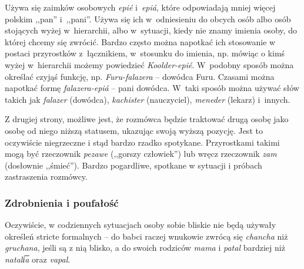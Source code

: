 \begin{spacing}{1.1}
\skipline

Używa się zaimków osobowych \emph{epié} i~\emph{epiá}, które odpowiadają mniej
więcej polskim ,,pan'' i~,,pani''. Używa się ich w~odniesieniu do obcych osób
albo osób stojących wyżej w~hierarchii, albo w~sytuacji, kiedy nie znamy imienia
osoby, do której chcemy się zwrócić. Bardzo często można napotkać ich stosowanie
w postaci przyrostków z~łącznikiem, w~stosunku do imienia, np. mówiąc o kimś
wyżej w~hierarchii możemy powiedzieć \emph{Koolder-epié}. W~podobny sposób
można określać czyjąś funkcję, np. \emph{Furu-falazera} -- dowódca Furu. Czasami
można napotkać formę \emph{falazera-epiá} -- pani dowódca. W~taki sposób można
używać słów takich jak \emph{falazer} (dowódca), \emph{kachister} (nauczyciel),
\emph{meneder} (lekarz) i~innych.


\skipline

Z drugiej strony, możliwe jest, że rozmówca będzie traktować drugą osobę jako
osobę od niego niższą statusem, ukazując swoją wyższą pozycję. Jest to
oczywiście niegrzeczne i stąd bardzo rzadko spotykane. Przyrostkami takimi mogą
być rzeczownik \emph{pezawe} (,,gorszy człowiek'') lub wręcz rzeczownik
\emph{zam} (dosłownie ,,śmieć''). Bardzo pogardliwe, spotkane w sytuacji i
próbach zastraszenia rozmówcy.

\subsubsection{Zdrobnienia i poufałość}

Oczywiście, w codziennych sytuacjach osoby sobie bliskie nie będą używały
określeń stricte formalnych -- do babci raczej wnukowie zwrócą się
\emph{chancha} niż \emph{gruchana}, jeśli są z nią blisko, a do swoich rodziców
\emph{mama} i \emph{patal} bardziej niż \emph{natali͞a} oraz \emph{vapal}.


\end{spacing}
